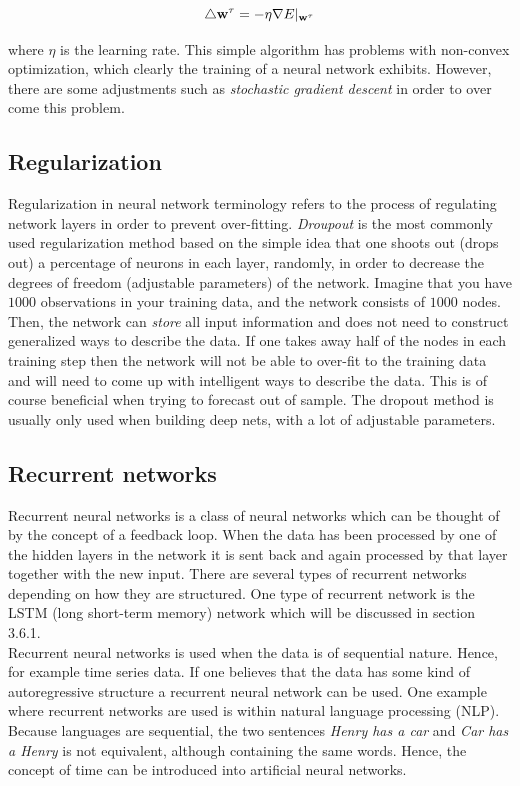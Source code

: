 \documentclass[12pt, letterpaper]{amsart}%
\begin{document}
\begin{equation}
\triangle \bold{w}^{\tau} = - \eta \nabla E \vert_{\bold{w}^{\tau}}
\end{equation}

where $\eta$ is the learning rate. This simple algorithm has problems with non-convex optimization, which clearly the training of a neural network exhibits. However, there are some adjustments such as \textit{stochastic gradient descent} in order to over come this problem.

\subsection{Regularization}
Regularization in neural network terminology refers to the process of regulating network layers in order to prevent over-fitting. \textit{Droupout} is the most commonly used regularization method based on the simple idea that one shoots out (drops out) a percentage of neurons in each layer, randomly, in order to decrease the degrees of freedom (adjustable parameters) of the network. Imagine that you have $1 000$ observations in your training data, and the network consists of $1 000$ nodes. Then, the network can \textit{store} all input information and does not need to construct generalized ways to describe the data. If one takes away half of the nodes in each training step then the network will not be able to over-fit to the training data and will need to come up with intelligent ways to describe the data. This is of course beneficial when trying to forecast out of sample. The dropout method is usually only used when building deep nets, with a lot of adjustable parameters.

\subsection{Recurrent networks}
Recurrent neural networks is a class of neural networks which can be thought of by the concept of a feedback loop. When the data has been processed by one of the hidden layers in the network it is sent back and again processed by that layer together with the new input. There are several types of recurrent networks depending on how they are structured. One type of recurrent network is the LSTM (long short-term memory) network which will be discussed in section 3.6.1.
\\

Recurrent neural networks is used when the data is of sequential nature. Hence, for example time series data. If one believes that the data has some kind of autoregressive structure a recurrent neural network can be used. One example where recurrent networks are used is within natural language processing (NLP). Because languages are sequential, the two sentences \textit{Henry has a car} and \textit{Car has a Henry} is not equivalent, although containing the same words. Hence, the concept of time can be introduced into artificial neural networks.
\end{document}

